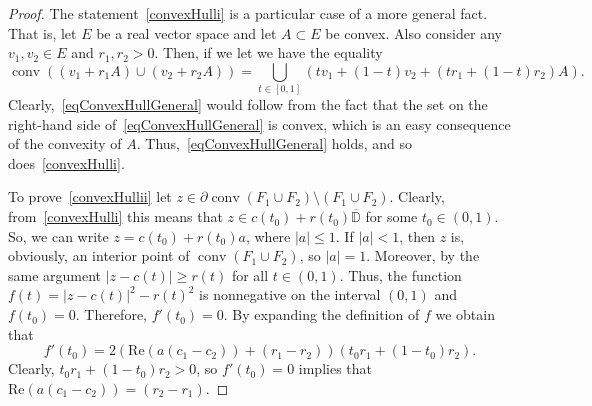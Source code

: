 \documentclass{amsart}
\numberwithin{equation}{section}
\theoremstyle{definition}
\theoremstyle{remark}
\DeclareMathOperator{\conv}{conv}
\begin{document}
	\begin{proof}
		The statement~\ref{convexHulli} is a particular case of a more general fact. That is, let $E$ be a real vector space and let $A \subset E$ be convex. Also consider any $v_1, v_2 \in E$ and $r_1, r_2 > 0$. Then, if we let we have the equality
		\begin{equation}\label{eqConvexHullGeneral}
			\conv((v_1 + r_1 A) \cup (v_2 + r_2A)) = \bigcup\limits_{t \in [0,1]} (tv_1 + (1-t)v_2 + (tr_1 + (1-t)r_2)A).
		\end{equation}
		Clearly,~\eqref{eqConvexHullGeneral} would follow from the fact that the set on the right-hand side of~\eqref{eqConvexHullGeneral} is convex, which is an easy consequence of the convexity of $A$. Thus,~\eqref{eqConvexHullGeneral} holds, and so does~\ref{convexHulli}.
		
		To prove~\ref{convexHullii} let $z \in \partial \conv(F_1 \cup F_2) \setminus (F_1 \cup F_2)$. Clearly, from~\ref{convexHulli} this means that $z \in c(t_0) + r(t_0)\overline{\mathbb D}$ for some $t_0 \in (0,1)$. So, we can write $z = c(t_0) + r(t_0)a$, where $|a| \le 1$. If $|a| < 1$, then $z$ is, obviously, an interior point of $\conv(F_1 \cup F_2)$, so $|a| = 1$. Moreover, by the same argument $|z - c(t)| \ge r(t)$ for all $t \in (0,1)$. Thus, the function $f(t) = |z - c(t)|^2 - r(t)^2$ is nonnegative on the interval $(0,1)$ and $f(t_0)= 0$. Therefore, $f'(t_0) = 0$. By expanding the definition of $f$ we obtain that
		\[
		f'(t_0) = 2(\mathrm{Re}(a(c_1 - c_2)) + (r_1 - r_2))(t_0 r_1 + (1-t_0)r_2).
		\]
		Clearly, $t_0 r_1 + (1-t_0)r_2 > 0$, so $f'(t_0) = 0$ implies that $\mathrm{Re}(a(c_1 - c_2)) = (r_2 - r_1)$.
	\end{proof}
	
\end{document}
